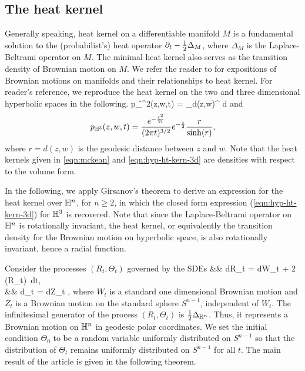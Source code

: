 \documentclass[12pt, reqno]{amsart}
\numberwithin{equation}{section}
\begin{document}
\subsection{The heat kernel}
Generally speaking, heat kernel on a differentiable manifold $M$ is a fundamental solution to the (probabilist's) heat operator $\partial_t - \frac12 \Delta_M$, where $\Delta_M$ is the Laplace-Beltrami operator on $M$. The minimal heat kernel also serves as the transition density of Brownian motion on $M$. 
We refer the reader to \cite{eltonbook} for expositions of Brownian motions on manifolds and their relationships to heat kernel. 
For reader's reference, we reproduce the heat kernel on the two and three dimensional hyperbolic spaces in the following.
\bea
 p_{\H^2}(z,w,t) =  \int_{d(z,w)}^\infty {} d\xi \label{eqn:mckean}
\eea
and
\begin{equation}
 p_{\mathbb{H}^3}(z,w,t) = \frac{e^{-\frac{r^2}{2t}}}{(2\pi t)^{3/2}} e^{-\frac{t}2} \frac r{\sinh(r)}, \label{eqn:hyp-ht-kern-3d}
\end{equation}
where $r = d(z,w)$ is the geodesic distance between $z$ and $w$. Note that the heat kernels given in \eqref{eqn:mckean} and \eqref{eqn:hyp-ht-kern-3d} are densities with respect to the volume form.

In the following, we apply Girsanov's theorem to derive an expression for the heat kernel over $\mathbb{H}^n$, for $n \geq 2$, in which the closed form expression (\ref{eqn:hyp-ht-kern-3d}) for $\mathbb{H}^3$ is recovered. 
Note that since the Laplace-Beltrami operator on $\mathbb{H}^n$ is rotationally invariant, the heat kernel, or equivalently the transition density for the Brownian motion on hyperbolic space, is also rotationally invariant, hence a radial function.

Consider the processes $(R_t, \Theta_t)$ governed by the SDEs
\bea
  && dR_t = dW_t + 2 \coth(R_t)\, dt, \label{eqn: R-process} \\
  && d\Theta_t =  dZ_t \label{eqn: theta-process},
\eea
where $W_t$ is a standard one dimensional Brownian motion and $Z_t$ is a Brownian motion on the standard sphere $S^{n-1}$, independent of $W_t$. The infinitesimal generator of the process $(R_t,\Theta_t)$ is $\frac12 \Delta_{\mathbb{H}^n}$. Thus, it represents a Brownian motion on $\mathbb{H}^n$ in geodesic polar coordinates. We set the initial condition $\Theta_0$ to be a random variable uniformly distributed on $S^{n-1}$ so that the distribution of  $\Theta_t$ remains uniformly distributed on $S^{n-1}$ for all $t$. The main result of the article is given in the following theorem. 
\end{document}
